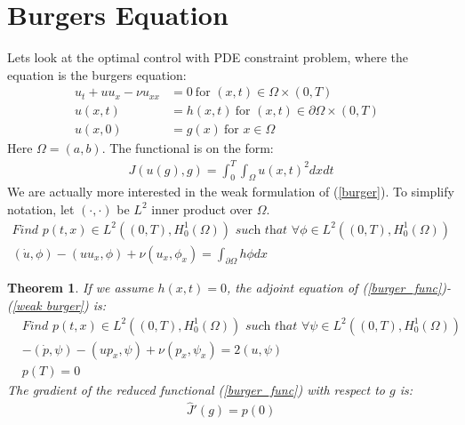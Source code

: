 \documentclass[11pt,a4paper]{article}
\newtheorem{theorem}{Theorem}
\begin{document}
\section{Burgers Equation}
Lets look at the optimal control with PDE constraint problem, where the equation is the burgers equation:
\begin{subequations}
\begin{align}
u_t + uu_x - \nu u_{xx} &= 0 \ \text{for $(x,t)\in \Omega\times(0,T)$} \label{burger}\\
u(x,t) &= h(x,t) \ \text{for $(x,t) \in\partial\Omega\times(0,T)$ } \\
u(x,0) &= g(x) \ \text{for $x \in\Omega$ }
\end{align} 
\end{subequations}
Here $\Omega = (a,b)$. The functional is on the form:
\begin{align}
J(u(g),g) = \int_0^T\int_{\Omega} u(x,t)^2 dxdt \label{burger_func}
\end{align}
We are actually more interested in the weak formulation of (\ref{burger}). To simplify notation, let $(\cdot,\cdot)$ be $L^2$ inner product over $\Omega$.
\begin{subequations}
\begin{gather}
\textit{Find $p(t,x) \in L^2((0,T),H_0^1(\Omega))$ such that } \forall \phi \in L^2((0,T),H_0^1(\Omega)) \\
(\dot{u},\phi) -(uu_x,\phi) +\nu(u_x,\phi_x) = \int_{\partial \Omega} h\phi dx \label{weak burger}
\end{gather}
\end{subequations}
\begin{theorem} If we assume $h(x,t)=0$, the adjoint equation of (\ref{burger_func})-(\ref{weak burger}) is:
\begin{align*}
&\textit{Find $p(t,x) \in L^2((0,T),H_0^1(\Omega))$ such that } \forall \psi \in L^2((0,T),H_0^1(\Omega)) \\
&-(\dot{p},\psi) -(up_x,\psi) +\nu(p_x,\psi_x) = 2(u,\psi) \\
&p(T)=0
\end{align*}
The gradient of the reduced functional (\ref{burger_func}) with respect to $g$ is:
\begin{align*}
\hat{J}'(g) = p(0)
\end{align*}
\end{theorem}
\end{document}
